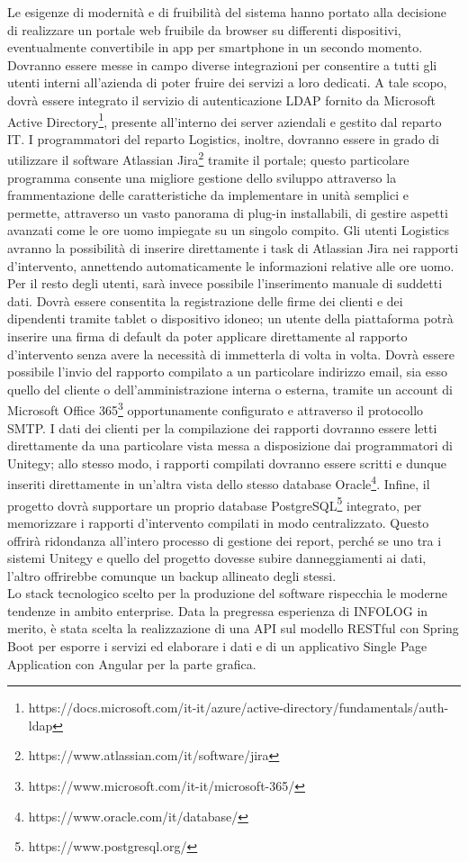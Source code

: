 Le esigenze di modernità e di fruibilità del sistema hanno portato alla decisione di realizzare un portale web fruibile da browser su differenti dispositivi, eventualmente
convertibile in app per smartphone in un secondo momento.
Dovranno essere messe in campo diverse integrazioni per consentire a tutti gli utenti interni all'azienda di poter fruire dei servizi a loro dedicati.
A tale scopo, dovrà essere integrato il servizio di autenticazione LDAP fornito da 
Microsoft Active Directory\footnote{https://docs.microsoft.com/it-it/azure/active-directory/fundamentals/auth-ldap}, presente all'interno dei server aziendali e gestito 
dal reparto IT.
I programmatori del reparto Logistics, inoltre, dovranno essere in grado di utilizzare il software Atlassian Jira\footnote{https://www.atlassian.com/it/software/jira} 
tramite il portale; questo particolare programma consente una migliore gestione dello sviluppo attraverso la frammentazione delle caratteristiche da implementare in unità 
semplici e permette, attraverso un vasto panorama di plug-in installabili, di gestire aspetti avanzati come le ore uomo impiegate su un singolo compito.
Gli utenti Logistics avranno la possibilità di inserire direttamente i task di Atlassian Jira nei rapporti d'intervento, annettendo automaticamente le informazioni relative 
alle ore uomo.
Per il resto degli utenti, sarà invece possibile l'inserimento manuale di suddetti dati.
Dovrà essere consentita la registrazione delle firme dei clienti e dei dipendenti tramite tablet o dispositivo idoneo; un utente della piattaforma potrà inserire una firma di default
da poter applicare direttamente al rapporto d'intervento senza avere la necessità di immetterla di volta in volta.
Dovrà essere possibile l'invio del rapporto compilato a un particolare indirizzo email, sia esso quello del cliente o dell'amministrazione interna o esterna, tramite un account di
Microsoft Office 365\footnote{https://www.microsoft.com/it-it/microsoft-365/} opportunamente configurato e attraverso il protocollo SMTP.
I dati dei clienti per la compilazione dei rapporti dovranno essere letti direttamente da una particolare vista messa a disposizione dai programmatori di Unitegy; allo stesso modo, 
i rapporti compilati dovranno essere scritti e dunque inseriti direttamente in un'altra vista dello stesso database Oracle\footnote{https://www.oracle.com/it/database/}.
Infine, il progetto dovrà supportare un proprio database PostgreSQL\footnote{https://www.postgresql.org/} integrato, per memorizzare i rapporti d'intervento compilati in modo 
centralizzato.
Questo offrirà ridondanza all'intero processo di gestione dei report, perché se uno tra i sistemi Unitegy e quello del progetto dovesse subire danneggiamenti ai dati, l'altro
offrirebbe comunque un backup allineato degli stessi.
\\
Lo stack tecnologico scelto per la produzione del software rispecchia le moderne tendenze in ambito enterprise.
Data la pregressa esperienza di INFOLOG in merito, è stata scelta la realizzazione di una API sul modello RESTful con Spring Boot per esporre i servizi ed elaborare i dati
e di un applicativo Single Page Application con Angular per la parte grafica.